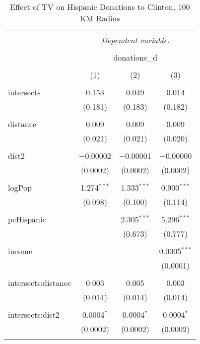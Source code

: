 
\begin{table}[!htbp] \centering 
  \caption{Effect of TV on Hispanic Donations to Clinton, 100 KM Radius} 
  \label{} 
\begin{tabular}{@{\extracolsep{-5pt}}lccc} 
\\[-1.8ex]\hline 
\hline \\[-1.8ex] 
 & \multicolumn{3}{c}{\textit{Dependent variable:}} \\ 
\cline{2-4} 
\\[-1.8ex] & \multicolumn{3}{c}{donations\_d} \\ 
\\[-1.8ex] & (1) & (2) & (3)\\ 
\hline \\[-1.8ex] 
 intersects & 0.153 & 0.049 & 0.014 \\ 
  & (0.181) & (0.183) & (0.182) \\ 
  & & & \\ 
 distance & 0.009 & 0.009 & 0.009 \\ 
  & (0.021) & (0.021) & (0.020) \\ 
  & & & \\ 
 dist2 & $-$0.00002 & $-$0.00001 & $-$0.00000 \\ 
  & (0.0002) & (0.0002) & (0.0002) \\ 
  & & & \\ 
 logPop & 1.274$^{***}$ & 1.333$^{***}$ & 0.900$^{***}$ \\ 
  & (0.098) & (0.100) & (0.114) \\ 
  & & & \\ 
 pcHispanic &  & 2.305$^{***}$ & 5.296$^{***}$ \\ 
  &  & (0.673) & (0.777) \\ 
  & & & \\ 
 income &  &  & 0.0005$^{***}$ \\ 
  &  &  & (0.0001) \\ 
  & & & \\ 
 intersects:distance & 0.003 & 0.005 & 0.003 \\ 
  & (0.014) & (0.014) & (0.014) \\ 
  & & & \\ 
 intersects:dist2 & 0.0004$^{*}$ & 0.0004$^{*}$ & 0.0004$^{*}$ \\ 
  & (0.0002) & (0.0002) & (0.0002) \\ 
  & & & \\ 

\end{tabular}
\end{table}
